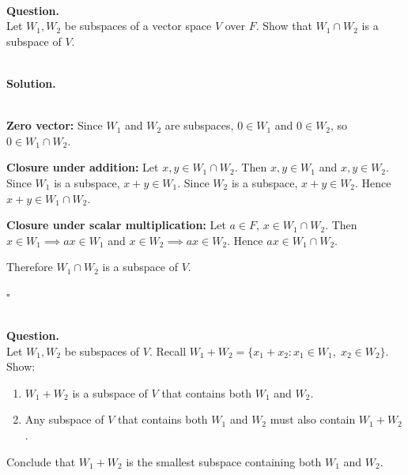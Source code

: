 \documentclass{article}
\begin{document}
\bigskip

\hfill \break  $~\!\!$ \dotfill \medskip \\
\textbf{Question.}\\
Let $W_1, W_2$ be subspaces of a vector space $V$ over $F$. Show that $W_1 \cap W_2$ is a subspace of $V$.

\noindent\\
\textbf{Solution.}\\
\quad\\
\begin{mdframed}[linewidth=1pt]
\textbf{Zero vector:} Since $W_1$ and $W_2$ are subspaces, $0 \in W_1$ and $0 \in W_2$, so $0 \in W_1 \cap W_2$.

\textbf{Closure under addition:} Let $x, y \in W_1 \cap W_2$. Then $x, y \in W_1$ and $x, y \in W_2$. Since $W_1$ is a subspace, $x + y \in W_1$. Since $W_2$ is a subspace, $x + y \in W_2$. Hence $x + y \in W_1 \cap W_2$.

\textbf{Closure under scalar multiplication:} Let $a \in F$, $x \in W_1 \cap W_2$. Then $x \in W_1 \implies ax \in W_1$ and $x \in W_2 \implies ax \in W_2$. Hence $ax \in W_1 \cap W_2$.

Therefore $W_1 \cap W_2$ is a subspace of $V$.

\hfill $\square$
\end{mdframed}

\bigskip

\hfill \break  $~\!\!$ \dotfill \medskip \\
\textbf{Question.}\\
Let $W_1, W_2$ be subspaces of $V$. Recall $W_1 + W_2 = \{x_1 + x_2 : x_1 \in W_1,\; x_2 \in W_2\}$. Show:
\begin{enumerate}
    \item $W_1 + W_2$ is a subspace of $V$ that contains both $W_1$ and $W_2$.
    \item Any subspace of $V$ that contains both $W_1$ and $W_2$ must also contain $W_1 + W_2$.
\end{enumerate}
Conclude that $W_1 + W_2$ is the smallest subspace containing both $W_1$ and $W_2$.
\end{document}
